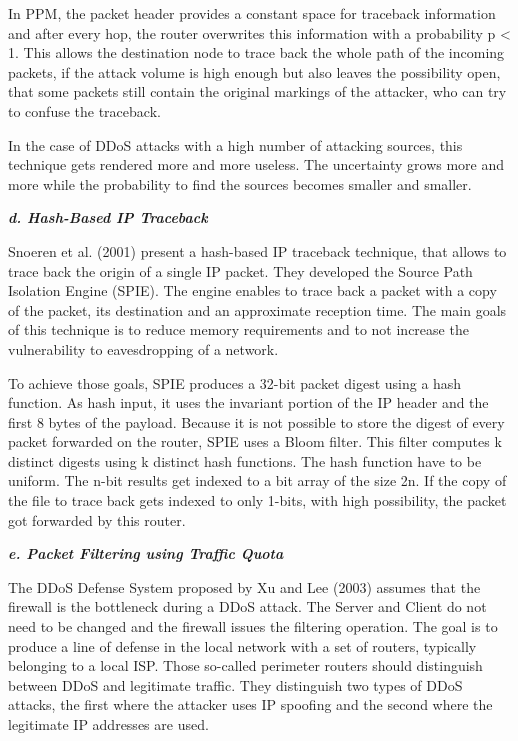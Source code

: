 In PPM, the packet header provides a constant space for traceback information and after every hop, the router overwrites this information with a probability p < 1.
This allows the destination node to trace back the whole path of the incoming packets, if the attack volume is high enough but also leaves the possibility open, that some packets still contain the original markings of the attacker, who can try to confuse the traceback.~\cite{Park01}

In the case of DDoS attacks with a high number of attacking sources, this technique gets rendered more and more useless.
The uncertainty grows more and more while the probability to find the sources becomes smaller and smaller.\cite{Park01}

\textbf{\textit{d. Hash-Based IP Traceback}}

Snoeren et al. (2001) present a hash-based IP traceback technique, that allows to trace back the origin of a single IP packet.
They developed the Source Path Isolation Engine (SPIE).
The engine enables to trace back a packet with a copy of the packet, its destination and an approximate reception time.
The main goals of this technique is to reduce memory requirements and to not increase the vulnerability to eavesdropping of a network.\cite{Snoeren01}

To achieve those goals, SPIE produces a 32-bit packet digest using a hash function.
As hash input, it uses the invariant portion of the IP header and the first 8 bytes of the payload.
Because it is not possible to store the digest of every packet forwarded on the router, SPIE uses a Bloom filter.
This filter computes k distinct digests using k distinct hash functions.
The hash function have to be uniform.
The n-bit results get indexed to a bit array of the size 2n.
If the copy of the file to trace back gets indexed to only 1-bits, with high possibility, the packet got forwarded by this router.\cite{Snoeren01}

\textbf{\textit{e. Packet Filtering using Traffic Quota}}

The DDoS Defense System proposed by Xu and Lee (2003) assumes that the firewall is the bottleneck during a DDoS attack.
The Server and Client do not need to be changed and the firewall issues the filtering operation.
The goal is to produce a line of defense in the local network with a set of routers, typically belonging to a local ISP\@.
Those so-called perimeter routers should distinguish between DDoS and legitimate traffic.
They distinguish two types of DDoS attacks, the first where the attacker uses IP spoofing and the second where the legitimate IP addresses are used.\cite{Xu03}

